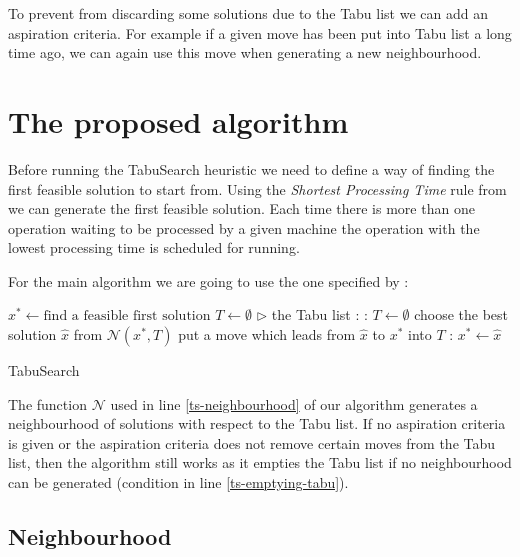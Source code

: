 \documentclass[14pt]{article}
\begin{document}
To prevent from discarding some solutions due to the Tabu list we can add an aspiration criteria. For example if a given move has been put into Tabu list a long time ago, we can again use this move when generating a new neighbourhood.

\section{The proposed algorithm}

Before running the TabuSearch heuristic we need to define a way of finding the first feasible solution to start from.
Using the \textit{Shortest Processing Time} rule from \citet[section 2.1]{brandimarte} we can generate the first feasible solution. Each time there is more than one operation waiting to be processed by a given machine the operation with the lowest processing time is scheduled for running.

For the main algorithm we are going to use the one specified by \citet[section 2.]{amico-trubian}:

\begin{algorithm}[H]
  \begin{algorithmic}[1]
    \State $x^* \gets \text{find a feasible first solution}$
    \State $T \gets \emptyset$ $\triangleright$ the Tabu list
    :
      : \label{ts-emptying-tabu}
        \State $T \gets \emptyset$
      \EndIf
      \State choose the best solution $\hat{x}$ from $\mathcal{N}(x^*, T)$ \label{ts-neighbourhood}
      \State put a move which leads from $\hat{x}$ to $x^*$ into $T$
      :
        \State $x^* \gets \hat{x}$
      \EndIf
    \EndWhile
  \end{algorithmic}
  \caption{TabuSearch}
  \label{tabu-search}
\end{algorithm}

The function $\mathcal{N}$ used in line \ref{ts-neighbourhood} of our algorithm generates a neighbourhood of solutions with respect to the Tabu list. If no aspiration criteria is given or the aspiration criteria does not remove certain moves from the Tabu list, then the algorithm still works as it empties the Tabu list if no neighbourhood can be generated (condition in line \ref{ts-emptying-tabu}).

\subsection{Neighbourhood}
\end{document}

